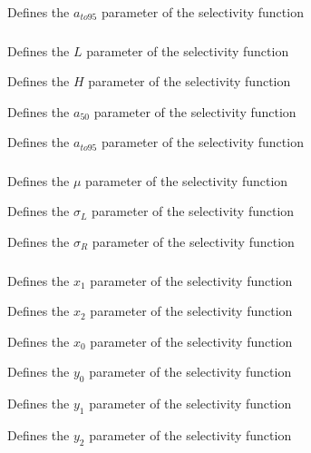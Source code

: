  {Defines the $a_{to95}$ parameter of the selectivity function}

\subsubsection[Logistic producing]{}

 {Defines the $L$ parameter of the selectivity function}

 {Defines the $H$ parameter of the selectivity function}

 {Defines the $a_{50}$ parameter of the selectivity function}

 {Defines the $a_{to95}$ parameter of the selectivity function}

\subsubsection[Double-normal]{}

 {Defines the $\mu$ parameter of the selectivity function}

 {Defines the $\sigma_L$ parameter of the selectivity function}

 {Defines the $\sigma_R$ parameter of the selectivity function}

\subsubsection[Double-exponential]{}

 {Defines the $x_1$ parameter of the selectivity function}

 {Defines the $x_2$ parameter of the selectivity function}

 {Defines the $x_0$ parameter of the selectivity function}

 {Defines the $y_0$ parameter of the selectivity function}

 {Defines the $y_1$ parameter of the selectivity function}

 {Defines the $y_2$ parameter of the selectivity function}
